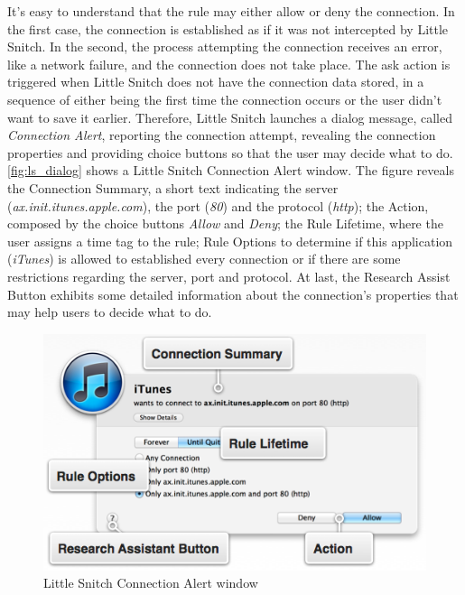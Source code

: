 It's easy to understand that the rule may either allow or deny the connection. In the first case, the connection is established as if it was not intercepted by Little Snitch. In the second, the process attempting the connection receives an error, like a network failure, and the connection does not take place. The ask action is triggered when Little Snitch does not have the connection data stored, in a sequence of either being the first time the connection occurs or the user didn't want to save it earlier. Therefore, Little Snitch launches a dialog message, called \textit{Connection Alert}, reporting the connection attempt, revealing the connection properties and providing choice buttons so that the user may decide what to do. \autoref{fig:ls_dialog} shows a Little Snitch Connection Alert window. The figure reveals the Connection Summary, a short text indicating the server (\textit{ax.init.itunes.apple.com}), the port (\textit{80}) and the protocol (\textit{http}); the Action, composed by the choice buttons \textit{Allow} and \textit{Deny}; the Rule Lifetime, where the user assigns a time tag to the rule; Rule Options to determine if this application (\textit{iTunes}) is allowed to established every connection or if there are some restrictions regarding the server, port and protocol. At last, the Research Assist Button exhibits some detailed information about the connection's properties that may help users to decide what to do.

\begin{figure}[h]
 \begin{center}
 \includegraphics[scale=0.5]{figures/LS_Dialog.png}
 \end{center}
 \caption{Little Snitch Connection Alert window}
 \label{fig:ls_dialog}
\end{figure}

